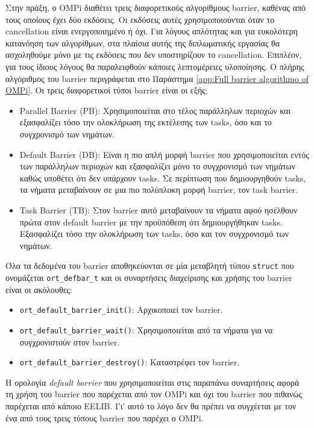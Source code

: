 Στην πράξη, ο OMPi διαθέτει τρεις διαφορετικούς αλγορίθμους barrier, καθένας από τους οποίους έχει δύο εκδόσεις. Οι εκδόσεις αυτές χρησιμοποιούνται όταν το cancellation είναι ενεργοποιημένο ή όχι. Για λόγους απλότητας και για ευκολότερη κατανόηση των αλγορίθμων, στα πλαίσια αυτής της διπλωματικής εργασίας θα ασχοληθούμε μόνο με τις εκδόσεις που δεν υποστηρίζουν το cancellation. Επιπλέον,  για τους ίδιους λόγους θα παραλειφθούν κάποιες λεπτομέρειες υλοποίησης. Ο πλήρης αλγόριθμος του barrier περιγράφεται στο Παράστημα \ref{app:Full barrier algorithmo of OMPi}. Οι τρεις διαφορετικοί τύποι barrier είναι οι εξής:
\begin{itemize}
	\item Parallel Barrier (PB): Χρησιμοποιείται στο τέλος παράλληλων περιοχών και εξασφαλίζει τόσο την ολοκλήρωση της εκτέλεσης των tasks, όσο και το συγχρονισμό των νημάτων.
	\item Default Barrier (DB): Είναι η πιο απλή μορφή barrier που χρησιμοποιείται εντός των παράλληλων περιοχών και εξασφαλίζει μόνο το συγχρονισμό των νημάτων καθώς υποθέτει ότι δεν υπάρχουν tasks. Σε περίπτωση που δημιουργηθούν tasks, τα νήματα μεταβαίνουν σε μια πιο πολύπλοκη μορφή barrier, τον task barrier. 
	\item Task Barrier (TB): Στον barrier αυτό μεταβαίνουν τα νήματα αφού ησέλθουν πρώτα στον default barrier με την προϋπόθεση ότι δημιουργήθηκαν tasks. Εξασφαλίζει τόσο την ολοκλήρωση των tasks, όσο και τον συγχρονισμό των νημάτων.
\end{itemize}

Όλα τα δεδομένα του barrier αποθηκεύονται σε μία μεταβλητή τύπου \texttt{struct} που ονομάζεται \texttt{ort\_defbar\_t} και οι συναρτήσεις διαχείρισης και χρήσης του barrier είναι οι ακόλουθες:

\begin{itemize}
	\item \texttt{ort\_default\_barrier\_init()}: Αρχικοποιεί τον barrier.
	\item \texttt{ort\_default\_barrier\_wait()}: Χρησιμοποιείται από τα νήματα για να συγχρονιστούν στον barrier.
	\item \texttt{ort\_default\_barrier\_destroy()}: Καταστρέφει τον barrier.
\end{itemize}

Η ορολογία \textit{default barrier} που χρησιμοποιείται στις παραπάνω συναρτήσεις αφορά τη χρήση του barrier που παρέχεται από τον OMPi και όχι του barrier που πιθανώς παρέχεται από κάποιο EELIB. Γι' αυτό το λόγο δεν θα πρέπει να συγχέεται με τον ένα από τους τρεις τύπους barrier που παρέχει ο OMPi.

